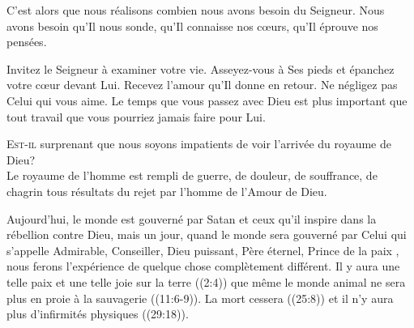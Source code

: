 C'est alors que nous réalisons combien nous avons besoin du Seigneur.
 Nous avons besoin qu'Il nous sonde, qu'Il connaisse nos c\oe{}urs,
 qu'Il éprouve nos pensées.

Invitez le Seigneur à examiner votre vie. Asseyez-vous à Ses pieds
 et épanchez votre c\oe{}ur devant Lui.
 Recevez l'amour qu'Il donne en retour. Ne négligez pas Celui qui vous aime.
 Le temps que vous passez avec Dieu est plus important
 que tout travail que vous pourriez jamais faire pour Lui.

\dvrule







\lettrine{E}{st-il} surprenant que nous soyons impatients
 de voir l'arrivée du royaume de Dieu? \\[1ex]
Le royaume de l'homme est rempli de guerre, de douleur, de souffrance,
 de chagrin \ocadr tous résultats du rejet par l'homme de l'Amour de Dieu. 


Aujourd'hui, le monde est gouverné par Satan et ceux qu'il inspire
 dans la rébellion contre Dieu, mais un jour, quand le monde sera gouverné
 par Celui qui s'appelle \Og Admirable, Conseiller, Dieu puissant,
 Père éternel, Prince de la paix \Fg{}, 
 nous ferons l'expérience de quelque chose complètement différent.
 Il y aura une telle paix et une telle joie sur la terre ((2:4))
 que même le monde animal ne sera plus en proie à la sauvagerie
 ((11:6-9)).
 La mort cessera ((25:8))
 et il n'y aura plus d'infirmités physiques ((29:18)). 

